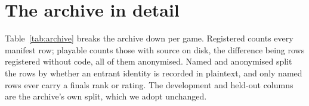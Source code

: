 %
%
%
%
%

\appendix

\section{The archive in detail}
\label{app:arena}

Table~\ref{tab:archive} breaks the archive down per game. Registered counts every
manifest row; playable counts those with source on disk, the difference being rows
registered without code, all of them anonymised. Named and anonymised split the rows by
whether an entrant identity is recorded in plaintext, and only named rows ever carry a
finals rank or rating. The development and held-out columns are the archive's own split,
which we adopt unchanged.

